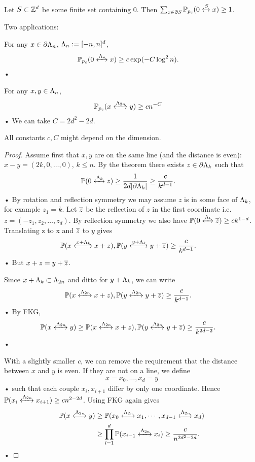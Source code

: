 \begin{thm}
Let $S\subset \mathbb{Z}^d$ be some finite set containing 0. Then $\sum_{x\in \partial S} \mathbb{P}_{p_c} (0\xleftrightarrow{S} x)\ge 1$. 
\end{thm}
Two applications:
\begin{lem}[K-Nachmias, 2011]
For any $x\in \partial \Lambda_n$, $\Lambda_n:=[-n,n]^d$,
\begin{align*}
\mathbb{P}_{p_c}(0\xleftrightarrow{\Lambda_n} x) &\ge c\exp(-C\log^2 n).
\end{align*}•
\end{lem}
\begin{lem}[Cerf, 2015]
For any $x,y\in \Lambda_n$, 
\begin{align*}
\mathbb{P}_{p_c} (x\xleftrightarrow{\Lambda_{2n}}y) &\ge cn^{-C}
\end{align*}•
We can take $C=2d^2-2d$.
\end{lem}
All constants $c,C$ might depend on the dimension.
\begin{proof}
Assume first that $x,y$ are on the same line (and the distance is even): $x-y=(2k,0,\ldots, 0)$, $k\le n$. By the theorem there exists $z\in \partial \Lambda_k$ such that
\begin{align*}
\mathbb{P}(0\xleftrightarrow{\Lambda_k}z) &\ge \frac{1}{2d|\partial \Lambda_k|}\ge \frac{c}{k^{d-1}}.
\end{align*}•
By rotation and reflection symmetry we may assume $z$ is in
some face of $\Lambda_k$, for example $z_1 = k$. Let $\overline{z}$ be the reflection of $z$
in the first coordinate i.e. $z =(-z_1, z_2, \ldots, z_d)$. By reflection
symmetry we also have $\mathbb{P}(0\xleftrightarrow{\Lambda_k} \overline{z}) \ge ck^{1-d}$. Translating z to x
and $\overline{z}$ to $y$ gives
\begin{align*}
\mathbb{P}(x\xleftrightarrow{x+\Lambda_k} x+z) , \mathbb{P}(y\xleftrightarrow{y+\Lambda_k} y+\overline{z}) &\ge \frac{c}{k^{d-1}}.
\end{align*}•
But $x+z=y+\overline{z}$. 

Since $x+\Lambda_k\subset \Lambda_{2n}$ and ditto for $y+\Lambda_k$, we can write
\begin{align*}
\mathbb{P}(x\xleftrightarrow{\Lambda_{2n}} x+z) , \mathbb{P}(y\xleftrightarrow{\Lambda_{2n}} y+\overline{z}) &\ge \frac{c}{k^{d-1}}.
\end{align*}•
By FKG, 
\begin{align*}
\mathbb{P}(x\xleftrightarrow{\Lambda_{2n}}y) \ge \mathbb{P}(x\xleftrightarrow{\Lambda_{2n}} x+z) , \mathbb{P}(y\xleftrightarrow{\Lambda_{2n}} y+\overline{z}) &\ge \frac{c}{k^{2d-2}}.
\end{align*}•

With a slightly smaller $c$, we
can remove the requirement that the distance between $x$ and $y$
is even. If they are not on a line, we define
\begin{align*}
x=x_0,\ldots, x_d=y
\end{align*}•
such that each couple $x_i,x_{i+1}$ differ by only one coordinate. Hence $\mathbb{P}(x_i\xleftrightarrow{\Lambda_{2n}}x_{i+1}) \ge cn^{2-2d}$. Using FKG again gives
\begin{align*}
\mathbb{P}(x\xleftrightarrow{\Lambda_{2n}}y) &\ge \mathbb{P}(x_0\xleftrightarrow{\Lambda_{2n}}x_1, \cdots ,x_{d-1}\xleftrightarrow{\Lambda_{2n}}x_d)\\
&\ge \prod_{i=1}^{d} \mathbb{P}(x_{i-1}\xleftrightarrow{\Lambda_{2n}} x_i) \ge \frac{c}{n^{2d^2-2d}}.
\end{align*}•
\end{proof}
